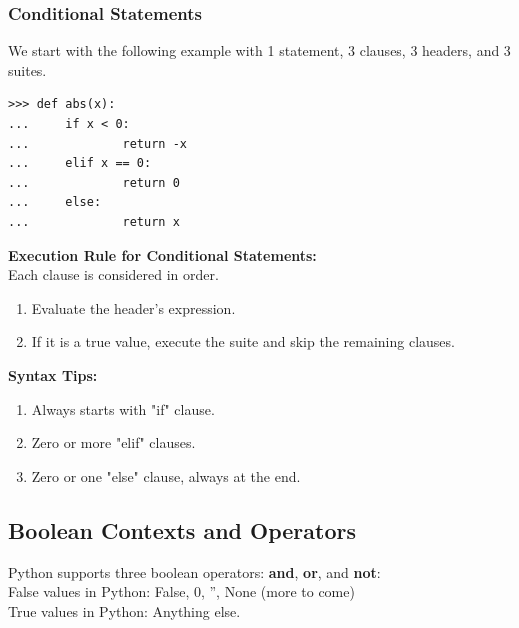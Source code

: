 \documentclass[11pt]{article}
\begin{document}
\subsubsection{Conditional Statements}
We start with the following example with 1 statement, 3 clauses, 3 headers, and 3 suites. 
\begin{lstlisting}
>>> def abs(x): 
...     if x < 0: 
...             return -x
...     elif x == 0:
...             return 0
...     else:
...             return x
\end{lstlisting}
\textbf{Execution Rule for Conditional Statements:} \\
Each clause is considered in order. 
\begin{enumerate}
\item Evaluate the header's expression. 
\item If it is a true value, execute the suite and skip the remaining clauses.
\end{enumerate}
\textbf{Syntax Tips:}
\begin{enumerate}
\item Always starts with "if" clause. 
\item Zero or more "elif" clauses. 
\item Zero or one "else" clause, always at the end.  
\end{enumerate}

\subsection{Boolean Contexts and Operators}
Python supports three boolean operators: \textbf{and}, \textbf{or}, and \textbf{not}: \\
False values in Python: False, 0, '', None (more to come) \\
True values in Python: Anything else.

\end{document}
